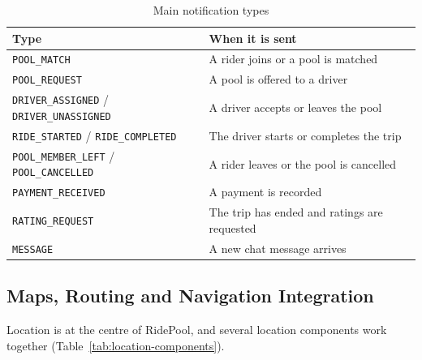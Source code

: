 \begin{table}[H]
  \centering
  \small
  \caption{Main notification types}
  \label{tab:notification-types}
  \begin{tabularx}{\textwidth}{@{}p{6.2cm}L@{}}
    \toprule
    \textbf{Type} & \textbf{When it is sent} \\
    \midrule
    \texttt{POOL\_MATCH} & A rider joins or a pool is matched \\
    \texttt{POOL\_REQUEST} & A pool is offered to a driver \\
    \texttt{DRIVER\_ASSIGNED} / \texttt{DRIVER\_UNASSIGNED} & A driver accepts or leaves the pool \\
    \texttt{RIDE\_STARTED} / \texttt{RIDE\_COMPLETED} & The driver starts or completes the trip \\
    \texttt{POOL\_MEMBER\_LEFT} / \texttt{POOL\_CANCELLED} & A rider leaves or the pool is cancelled \\
    \texttt{PAYMENT\_RECEIVED} & A payment is recorded \\
    \texttt{RATING\_REQUEST} & The trip has ended and ratings are requested \\
    \texttt{MESSAGE} & A new chat message arrives \\
    \bottomrule
  \end{tabularx}
\end{table}

\subsection{Maps, Routing and Navigation Integration}
\label{subsec:maps-integration}

Location is at the centre of RidePool, and several location components work
together (Table~\ref{tab:location-components}).

